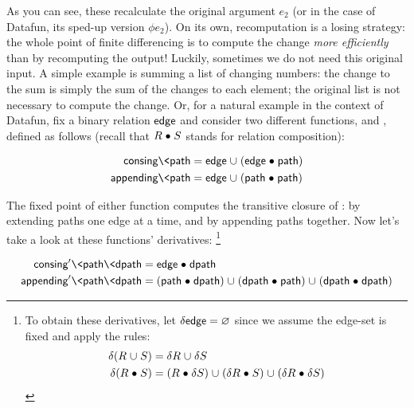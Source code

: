 \noindent
As you can see, these recalculate the original argument $e_2$ (or in the case of Datafun, its sped-up version $\phi e_2$).
%
%
On its own, recomputation is a losing strategy: the whole point of finite
differencing is to compute the change \emph{more efficiently} than by
recomputing the output!
%
Luckily, sometimes we do not need this original input.
%
A simple example is summing a list of changing numbers: the change to the sum is simply the sum of the changes to each element; the original list is not necessary to compute the change.
%
Or, for a natural example in the context of Datafun, fix a binary relation $\text{\sffamily edge}$ and consider two different functions,  and , defined as follows (recall that $R \mathrel{\bullet} S$ stands for relation composition):

\nopagebreak[2]
\begin{align*}
  \name{consing} \<\name{path}
  &= \name{edge} \cup (\name{edge} \relcomp \name{path})
  \\
  \name{appending} \<\name{path}
  &= \name{edge} \cup (\name{path} \relcomp \name{path})
\end{align*}

\noindent
The fixed point of either function computes the transitive closure of
:  by extending paths one edge at a time, and
 by appending paths together. Now let's take a look at these
functions' derivatives:%
%
\footnote{To obtain these derivatives, let $\delta \text{\sffamily edge} = \varnothing$
  since we assume the edge-set is fixed and apply the rules:
  \begin{align*}
  \delta(R \cup S) &= \delta R \cup \delta S
  \\
  \delta(R \relcomp S) &=
  (R \relcomp \delta S) \cup (\delta R \relcomp S) \cup (\delta R \relcomp \delta S)
  \end{align*}}

\begin{align*}
  \name{consing}' \<\name{path} \<\name{dpath}
  &= \name{edge} \relcomp \name{dpath}
  \\
  \name{appending}' \<\name{path} \<\name{dpath}
  &= (\name{path} \relcomp \name{dpath})
  \cup (\name{dpath} \relcomp \name{path})
  \cup (\name{dpath} \relcomp \name{dpath})
\end{align*}

